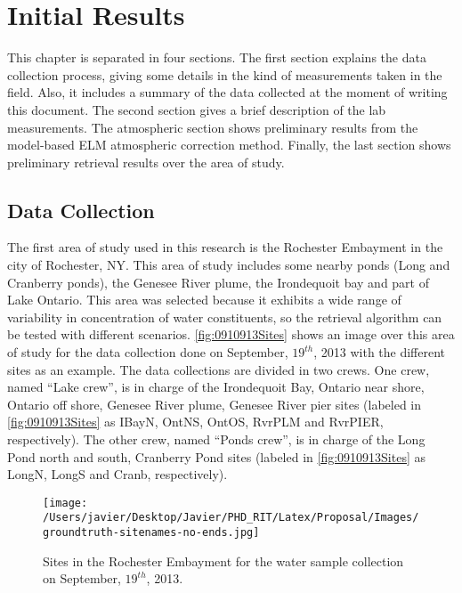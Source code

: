 \chapter{Initial Results}
This chapter is separated in four sections. The first section explains the data collection process, giving some details in the kind of measurements taken in the field. Also, it includes a summary of the data collected at the moment of writing this document. The second section gives a brief description of the lab measurements. The atmospheric section shows preliminary results from the model-based ELM atmospheric correction method. Finally, the last section shows preliminary retrieval results over the area of study.
\section{Data Collection}

The first area of study used in this research is the Rochester Embayment in the city of Rochester, NY. This area of study includes some nearby ponds (Long and Cranberry ponds), the Genesee River plume, the Irondequoit bay and part of Lake Ontario. This area was selected because it exhibits a wide range of variability in concentration of water constituents, so the retrieval algorithm can be tested with different scenarios. \autoref{fig:0910913Sites} shows an image over this area of study for the data collection done on September, $19^{th}$, 2013  with the different sites as an example. The data collections are divided in two crews. One crew, named ``Lake crew'', is in charge of the Irondequoit Bay, Ontario near shore, Ontario off shore, Genesee River plume, Genesee River pier sites (labeled in \autoref{fig:0910913Sites} as IBayN, OntNS, OntOS, RvrPLM and RvrPIER, respectively). The other crew, named ``Ponds crew'', is in charge of the Long Pond north and south, Cranberry Pond sites (labeled in \autoref{fig:0910913Sites} as LongN, LongS and Cranb, respectively).

\begin{figure}[htb]
  \centering
  \texttt{[image: /Users/javier/Desktop/Javier/PHD\_RIT/Latex/Proposal/Images/groundtruth-sitenames-no-ends.jpg]}
  \caption{Sites in the Rochester Embayment for the water sample collection on September, $19^{th}$, 2013.\label{fig:0910913Sites} } 
\end{figure}

